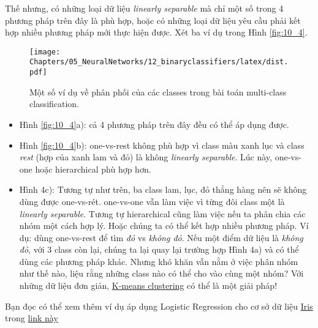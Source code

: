 Thế nhưng, có những loại dữ liệu \textit{linearly separable} mà chỉ một số trong 4 phương pháp trên đây là phù hợp, hoặc có những loại dữ liệu yêu cầu phải kết hợp nhiều phương pháp mới thực hiện được. Xét ba ví dụ trong Hình \eqref{fig:10_4}.
 
\begin{figure}[t]
\centering
    \texttt{[image: Chapters/05\_NeuralNetworks/12\_binaryclassifiers/latex/dist.pdf]}
    \caption[]{Một số ví dụ về phân phối của các classes trong bài toán multi-class classification.}
    \label{fig:10_4}
\end{figure}
\begin{itemize}
\item Hình \eqref{fig:10_4}a): cả 4 phương pháp trên đây đều có thể áp dụng được. 
 
\item Hình \eqref{fig:10_4}b): one-vs-rest không phù hợp vì class màu xanh lục và class \textit{rest} (hợp của xanh lam và đỏ) là không \textit{linearly separable}. Lúc này, one-vs-one hoặc hierarchical phù hợp hơn.  
 
\item Hình 4c): Tương tự như trên, ba class lam, lục, đỏ thẳng hàng nên sẽ không dùng được one-vs-rét. one-vs-one vẫn làm việc vì từng đôi class một là \textit{linearly separable}. Tương tự hierarchical cũng làm việc nếu ta phân chia các nhóm một cách hợp lý. Hoặc chúng ta có thể kết hợp nhiều phương pháp. Ví dụ: dùng one-vs-rest để tìm \textit{đỏ} vs \textit{không đỏ}. Nếu một điểm dữ liệu là \textit{không đỏ}, với 3 class còn lại, chúng ta lại quay lại trường hợp Hình 4a) và có thể dùng các phương pháp khác. Nhưng khó khăn vẫn nằm ở việc phân nhóm như thế nào, liệu rằng những class nào có thể cho vào cùng một nhóm? Với những dữ liệu đơn giản, \href{http://machinelearningcoban.com/2017/01/01/kmeans/}{K-means clustering} có thể là một giải pháp! 
\end{itemize}
 
Bạn đọc có thể xem thêm ví dụ áp dụng Logistic Regression cho cơ sở dữ liệu \href{http://machinelearningcoban.com/2017/01/08/knn/#bo-co-so-du-lieu-iris-iris-flower-dataset}{Iris} trong \href{http://scikit-learn.org/stable/auto_examples/linear_model/plot_iris_logistic.html}{link này} 
 
 
 

